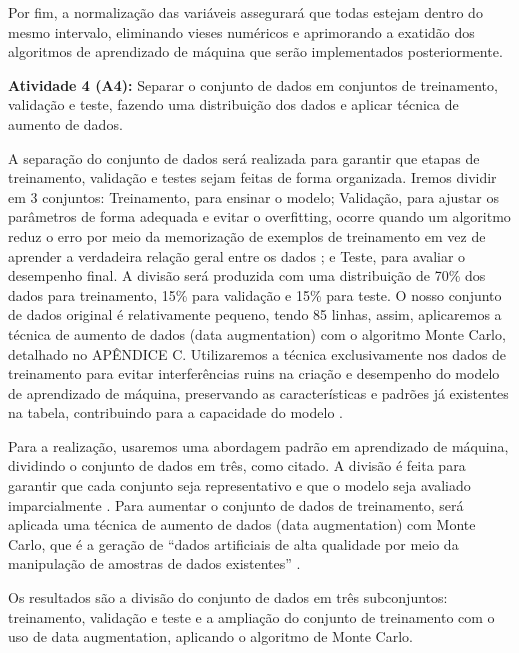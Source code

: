 Por fim, a normalização das variáveis assegurará que todas estejam dentro do mesmo intervalo, eliminando vieses numéricos e aprimorando a exatidão dos algoritmos de aprendizado de máquina que serão implementados posteriormente.


\textbf{Atividade 4 (A4):} Separar o conjunto de dados em conjuntos de treinamento, validação e teste, fazendo uma distribuição dos dados e aplicar técnica de aumento de dados.
   
A separação do conjunto de dados será realizada para garantir que etapas de treinamento, validação e testes sejam feitas de forma organizada. Iremos dividir em 3 conjuntos: Treinamento, para ensinar o modelo; Validação, para ajustar os parâmetros de forma adequada e evitar o overfitting, ocorre quando um algoritmo reduz o erro por meio da memorização de exemplos de treinamento em vez de aprender a verdadeira relação geral entre os dados \cite{bashir2020}; e Teste, para avaliar o desempenho final. A divisão será produzida com uma distribuição de 70\% dos dados para treinamento, 15\% para validação e 15\% para teste. O nosso conjunto de dados original é relativamente pequeno, tendo 85 linhas, assim, aplicaremos a técnica de aumento de dados (data augmentation) com o algoritmo Monte Carlo, detalhado no APÊNDICE C. Utilizaremos a técnica exclusivamente nos dados de treinamento para evitar interferências ruins na criação e desempenho do modelo de aprendizado de máquina, preservando as características e padrões já existentes na tabela, contribuindo para a capacidade do modelo \cite{kiar2021}. 

Para a realização, usaremos uma abordagem padrão em aprendizado de máquina, dividindo o conjunto de dados em três, como citado. A divisão é feita para garantir que cada conjunto seja representativo e que o modelo seja avaliado imparcialmente \cite{bashir2020}. Para aumentar o conjunto de dados de treinamento, será aplicada uma técnica de aumento de dados (data augmentation) com Monte Carlo, que é a geração de “dados artificiais de alta qualidade por meio da manipulação de amostras de dados existentes” \cite{wang2019}. 

Os resultados são a divisão do conjunto de dados em três subconjuntos: treinamento, validação e teste e a ampliação do conjunto de treinamento com o uso de data augmentation, aplicando o algoritmo de Monte Carlo. 

